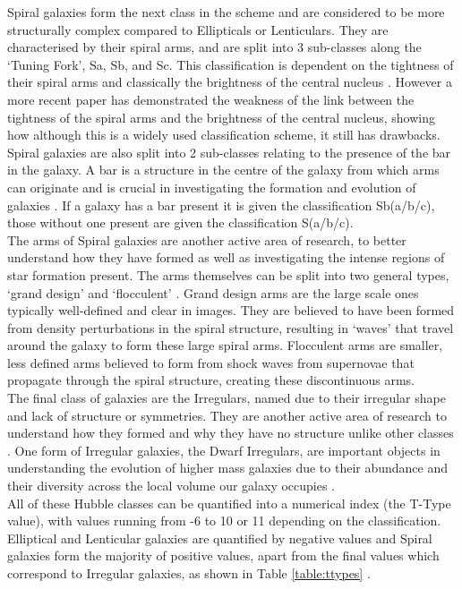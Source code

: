 \documentclass[12pt, onecolumn]{aa}
\begin{document}
Spiral galaxies form the next class in the scheme and are considered to be more structurally complex compared to Ellipticals or Lenticulars. They are characterised by their spiral arms, and are split into 3 sub-classes along the ‘Tuning Fork’, Sa, Sb, and Sc. This classification is dependent on the tightness of their spiral arms and classically the brightness of the central nucleus \citep{AGNThesis2016}. However a more recent paper \citep{Masters2019} has demonstrated the weakness of the link between the tightness of the spiral arms and the brightness of the central nucleus, showing how although this is a widely used classification scheme, it still has drawbacks. Spiral galaxies are also split into 2 sub-classes relating to the presence of the bar in the galaxy. A bar is a structure in the centre of the galaxy from which arms can originate and is crucial in investigating the formation and evolution of galaxies \citep{Sellwood_1993}. If a galaxy has a bar present it is given the classification Sb(a/b/c), those without one present are given the classification S(a/b/c).\\

The arms of Spiral galaxies are another active area of research, to better understand how they have formed as well as investigating the intense regions of star formation present. The arms themselves can be split into two general types, ‘grand design’ and ‘flocculent’ \citep{Elmegreen2014}. Grand design arms are the large scale ones typically well-defined and clear in images. They are believed to have been formed from density perturbations in the spiral structure, resulting in ‘waves’ that travel around the galaxy to form these large spiral arms. Flocculent arms are smaller, less defined arms believed to form from shock waves from supernovae that propagate through the spiral structure, creating these discontinuous arms.\\

The final class of galaxies are the Irregulars, named due to their irregular shape and lack of structure or symmetries. They are another active area of research to understand how they formed and why they have no structure unlike other classes \citep{SANDAGEMountWilson}. One form of Irregular galaxies, the Dwarf Irregulars, are important objects in understanding the evolution of higher mass galaxies due to their abundance and their diversity across the local volume our galaxy occupies \citep{dwarfgalaxies2014}.\\

All of these Hubble classes can be quantified into a numerical index (the T-Type value), with values running from -6 to 10 or 11 depending on the classification. Elliptical and Lenticular galaxies are quantified by negative values and Spiral galaxies form the majority of positive values, apart from the final values which correspond to Irregular galaxies, as shown in Table \ref{table:ttypes} \citep{1974IAUS...58....1D}.
\end{document}
